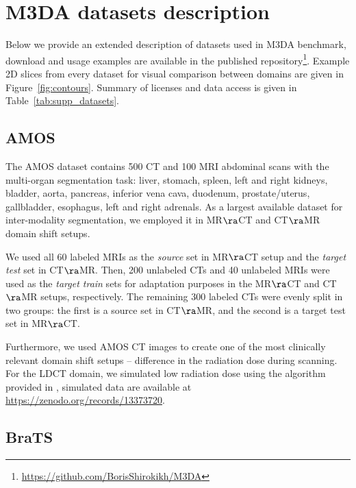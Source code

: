 \chapter{M3DA datasets description}
\label{app:m3da_datasets}


Below we provide an extended description of datasets used in M3DA benchmark, download and usage examples are available in the published repository\footnote{\href{https://github.com/BorisShirokikh/M3DA}{https://github.com/BorisShirokikh/M3DA}}. Example 2D slices from every dataset for visual comparison between domains are given in Figure~\ref{fig:contours}. Summary of licenses and data access is given in Table~\ref{tab:supp_datasets}.




\section{AMOS}

The AMOS dataset \cite{amos} contains 500 CT and 100 MRI abdominal scans with the multi-organ segmentation task: liver, stomach, spleen, left and right kidneys, bladder, aorta, pancreas, inferior vena cava, duodenum, prostate/uterus, gallbladder, esophagus, left and right adrenals. As a largest available dataset for inter-modality segmentation, we employed it in MR$\ra$CT and CT$\ra$MR domain shift setups. 

We used all 60 labeled MRIs as the \textit{source} set in MR$\ra$CT setup and the \textit{target test} set in CT$\ra$MR. Then, 200 unlabeled CTs and 40 unlabeled MRIs were used as the \textit{target train} sets for adaptation purposes in the MR$\ra$CT and CT$\ra$MR setups, respectively. The remaining 300 labeled CTs were evenly split in two groups: the first is a source set in CT$\ra$MR, and the second is a target test set in MR$\ra$CT.

Furthermore, we used AMOS CT images to create one of the most clinically relevant domain shift setups -- difference in the radiation dose during scanning. 
For the LDCT domain, we simulated low radiation dose using the algorithm provided in \cite{ldct}, simulated data are available at \href{https://zenodo.org/records/13373720}{https://zenodo.org/records/13373720}.


\section{BraTS}

